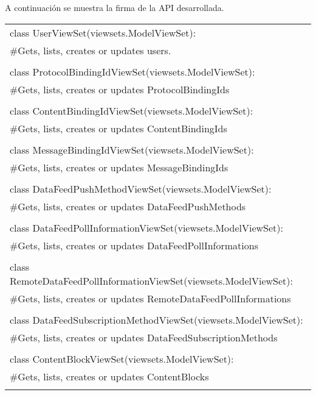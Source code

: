 \documentclass[11pt]{article}
\begin{document}
A continuación se muestra la firma de la API desarrollada.
\begin{center}
	\begin{tabular}{|l|}
		\hline
		class UserViewSet(viewsets.ModelViewSet):\\
		\#Gets, lists, creates or updates users.\\ \\
		
		class ProtocolBindingIdViewSet(viewsets.ModelViewSet):\\
		\#Gets, lists, creates or updates ProtocolBindingIds\\ \\
		
		class ContentBindingIdViewSet(viewsets.ModelViewSet):\\
		\#Gets, lists, creates or updates ContentBindingIds\\ \\
		
		class MessageBindingIdViewSet(viewsets.ModelViewSet):\\
		\#Gets, lists, creates or updates MessageBindingIds\\ \\
		
		class DataFeedPushMethodViewSet(viewsets.ModelViewSet):\\
		\#Gets, lists, creates or updates DataFeedPushMethods\\ \\
		
		class DataFeedPollInformationViewSet(viewsets.ModelViewSet):\\
		\#Gets, lists, creates or updates DataFeedPollInformations\\ \\
		
		class RemoteDataFeedPollInformationViewSet(viewsets.ModelViewSet):\\
		\#Gets, lists, creates or updates RemoteDataFeedPollInformations\\ \\
		
		class DataFeedSubscriptionMethodViewSet(viewsets.ModelViewSet):\\
		\#Gets, lists, creates or updates DataFeedSubscriptionMethods\\ \\
		
		class ContentBlockViewSet(viewsets.ModelViewSet):\\
		\#Gets, lists, creates or updates ContentBlocks\\ \\
		

\end{tabular}
\end{center}
\end{document}
